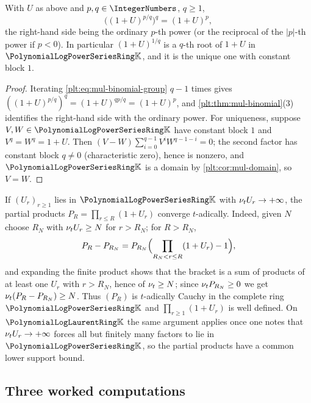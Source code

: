 \begin{corollary}
\label{plt:cor:mul-roots}
With $U$ as above and $p,q\in\IntegerNumbers$, $q\ge1$,
\[
 \bigl((1+U)^{p/q}\bigr)^{q}=(1+U)^{p},
\]
the right-hand side being the ordinary $p$-th power (or the reciprocal of the
$|p|$-th power if $p<0$).  In particular $(1+U)^{1/q}$ is a $q$-th root of
$1+U$ in $\PLpow$, and it is the unique one with constant block $1$.
\end{corollary}

\begin{proof}
Iterating \eqref{plt:eq:mul-binomial-group} $q-1$ times gives
$((1+U)^{p/q})^q=(1+U)^{qp/q}=(1+U)^p$, and
\cref{plt:thm:mul-binomial}(3) identifies the right-hand side with the
ordinary power.  For uniqueness, suppose $V,W\in\PLpow$ have constant block
$1$ and $V^q=W^q=1+U$.  Then $(V-W)\sum_{i=0}^{q-1}V^iW^{q-1-i}=0$; the
second factor has constant block $q\ne0$ (characteristic zero), hence is
nonzero, and $\PLpow$ is a domain by \cref{plt:cor:mul-domain}, so $V=W$.
\end{proof}

\begin{remark}
\label{plt:rmk:mul-infinite-products}
If $(U_r)_{r\ge1}$ lies in $\PLpow$ with $\nu_{t} U_r\to+\infty$, the partial
products $P_R=\prod_{r\le R}(1+U_r)$ converge $t$-adically.  Indeed, given
$N$ choose $R_N$ with $\nu_{t} U_r\ge N$ for $r>R_N$; for $R>R_N$,
\[
 P_R-P_{R_N}=P_{R_N}\Bigl(\prod_{R_N<r\le R}(1+U_r)-1\Bigr),
\]
and expanding the finite product shows that the bracket is a sum of products
of at least one $U_r$ with $r>R_N$, hence of $\nu_{t}\ge N$; since
$\nu_{t} P_{R_N}\ge0$ we get $\nu_{t}(P_R-P_{R_N})\ge N$.  Thus $(P_R)$ is
$t$-adically Cauchy in the complete ring $\PLpow$ and
$\prod_{r\ge1}(1+U_r)$ is well defined.  On $\PLlau$ the same argument
applies once one notes that $\nu_{t} U_r\to+\infty$ forces all but finitely
many factors to lie in $\PLpow$, so the partial products have a common lower
support bound.
\end{remark}

\subsection{Three worked computations}
\label{plt:sec:mul-worked}

